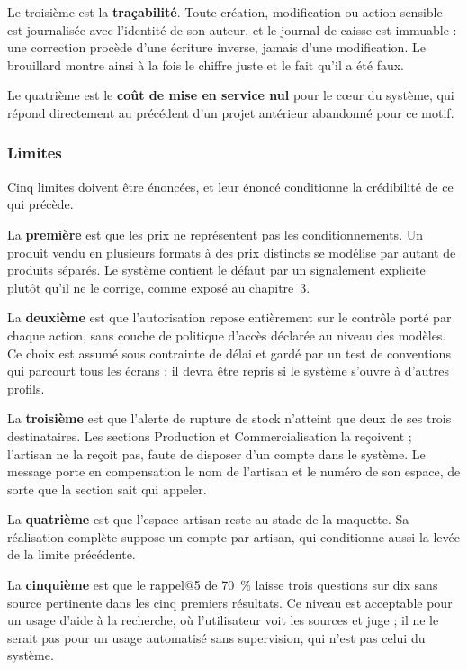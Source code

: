 Le troisième est la \textbf{traçabilité}. Toute création, modification ou action sensible est journalisée avec l'identité de son auteur, et le journal de caisse est immuable : une correction procède d'une écriture inverse, jamais d'une modification. Le brouillard montre ainsi à la fois le chiffre juste et le fait qu'il a été faux.

Le quatrième est le \textbf{coût de mise en service nul} pour le cœur du système, qui répond directement au précédent d'un projet antérieur abandonné pour ce motif.

\subsubsection{Limites}
\label{sec:4-2-3}

Cinq limites doivent être énoncées, et leur énoncé conditionne la crédibilité de ce qui précède.

La \textbf{première} est que les prix ne représentent pas les conditionnements. Un produit vendu en plusieurs formats à des prix distincts se modélise par autant de produits séparés. Le système contient le défaut par un signalement explicite plutôt qu'il ne le corrige, comme exposé au chapitre~3.

La \textbf{deuxième} est que l'autorisation repose entièrement sur le contrôle porté par chaque action, sans couche de politique d'accès déclarée au niveau des modèles. Ce choix est assumé sous contrainte de délai et gardé par un test de conventions qui parcourt tous les écrans ; il devra être repris si le système s'ouvre à d'autres profils.

La \textbf{troisième} est que l'alerte de rupture de stock n'atteint que deux de ses trois destinataires. Les sections Production et Commercialisation la reçoivent ; l'artisan ne la reçoit pas, faute de disposer d'un compte dans le système. Le message porte en compensation le nom de l'artisan et le numéro de son espace, de sorte que la section sait qui appeler.

La \textbf{quatrième} est que l'espace artisan reste au stade de la maquette. Sa réalisation complète suppose un compte par artisan, qui conditionne aussi la levée de la limite précédente.

La \textbf{cinquième} est que le rappel@5 de 70~\% laisse trois questions sur dix sans source pertinente dans les cinq premiers résultats. Ce niveau est acceptable pour un usage d'aide à la recherche, où l'utilisateur voit les sources et juge ; il ne le serait pas pour un usage automatisé sans supervision, qui n'est pas celui du système.

